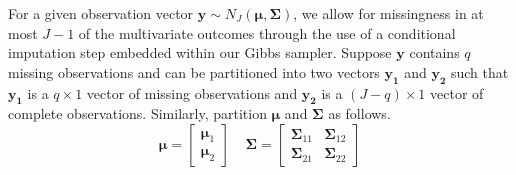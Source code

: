 \documentclass{article}
\begin{document}
For a given observation vector $\mathbf{y} \sim N_J(\boldsymbol\mu, \boldsymbol\Sigma)$, we allow for missingness in at most $J - 1$ of the multivariate outcomes through the use of a conditional imputation step embedded within our Gibbs sampler. Suppose $\mathbf{y}$ contains $q$ missing observations and can be partitioned into two vectors $\mathbf{y_{1}}$ and $\mathbf{y_{2}}$ such that $\mathbf{y_{1}}$ is a $q \times 1$ vector of missing observations and $\mathbf{y_{2}}$ is a $(J-q) \times 1$ vector of complete observations. Similarly, partition $\boldsymbol\mu$ and $\boldsymbol\Sigma$ as follows.
$$\boldsymbol\mu = \begin{bmatrix} \boldsymbol\mu_1 \\ \boldsymbol\mu_2 \end{bmatrix} \ \ \ \ \ \boldsymbol\Sigma = \begin{bmatrix} \boldsymbol\Sigma_{11} & \boldsymbol\Sigma_{12} \\ \boldsymbol\Sigma_{21} & \boldsymbol\Sigma_{22} \end{bmatrix}$$
\end{document}
